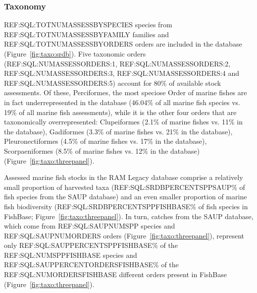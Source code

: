 
\subsubsection*{Taxonomy}

REF:SQL:TOTNUMASSESSBYSPECIES species from
REF:SQL:TOTNUMASSESSBYFAMILY families and REF:SQL:TOTNUMASSESSBYORDERS
orders are included in the database (Figure~\ref{fig:taxo:srdb}). Five
taxonomic orders (REF:SQL:NUMASSESSORDERS:1,
REF:SQL:NUMASSESSORDERS:2, REF:SQL:NUMASSESSORDERS:3,
REF:SQL:NUMASSESSORDERS:4 and REF:SQL:NUMASSESSORDERS:5) account for
80\% of available stock assessments.  Of these, Perciformes, the
most speciose Order of marine fishes are in fact underrepresented in
the database (46.04\% of all marine fish species vs.  19\%
of all marine fish assessments), while it is the other four orders
that are taxonomically overrepresented: Clupeiformes (2.1\% of marine
fishes vs.  11\% in the database), Gadiformes (3.3\% of marine fishes
vs.  21\% in the database), Pleuronectiformes (4.5\% of marine fishes
vs.  17\% in the database), Scorpaeniformes (8.5\% of marine fishes
vs. 12\% in the database) (Figure~\ref{fig:taxo:threepanel}).

Assessed marine fish stocks in the RAM Legacy database comprise a
relatively small proportion of harvested taxa (REF:SQL:SRDBPERCENTSPPSAUP\% of fish species
from the SAUP database) and an even smaller proportion of marine fish
biodiversity (REF:SQL:SRDBPERCENTSPPFISHBASE\% of fish species in FishBase;
Figure~\ref{fig:taxo:threepanel}). In turn, catches from the SAUP
database, which come from REF:SQL:SAUPNUMSPP species and
REF:SQL:SAUPNUMORDERS orders (Figure~\ref{fig:taxo:threepanel}),
represent only REF:SQL:SAUPPERCENTSPPFISHBASE\% of the REF:SQL:NUMSPPFISHBASE species and REF:SQL:SAUPPERCENTORDERSFISHBASE\% of
the REF:SQL:NUMORDERSFISHBASE different orders present in FishBase
(Figure~\ref{fig:taxo:threepanel}).



